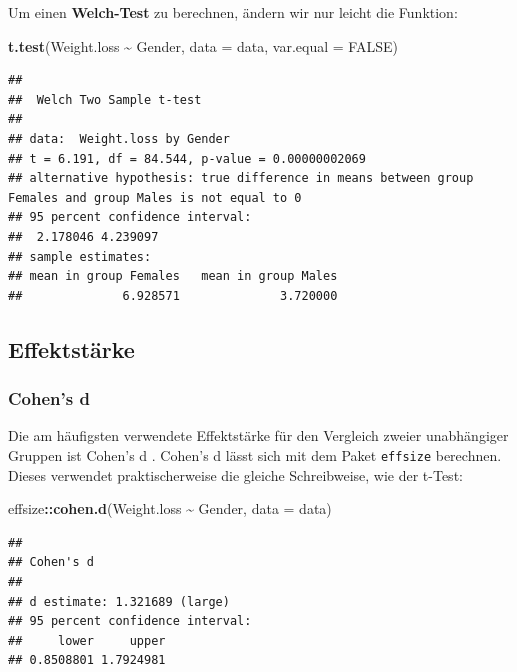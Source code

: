 \documentclass[
]{book}
\newenvironment{Shaded}{\begin{snugshade}}{\end{snugshade}}
\newcommand{\AttributeTok}[1]{\textcolor[rgb]{0.13,0.29,0.53}{#1}}
\newcommand{\ConstantTok}[1]{\textcolor[rgb]{0.56,0.35,0.01}{#1}}
\newcommand{\FunctionTok}[1]{\textcolor[rgb]{0.13,0.29,0.53}{\textbf{#1}}}
\newcommand{\NormalTok}[1]{#1}
\newcommand{\SpecialCharTok}[1]{\textcolor[rgb]{0.81,0.36,0.00}{\textbf{#1}}}
\begin{document}
Um einen \textbf{Welch-Test} zu berechnen, ändern wir nur leicht die Funktion:

\begin{Shaded}
\begin{Highlighting}[]
\FunctionTok{t.test}\NormalTok{(Weight.loss }\SpecialCharTok{\textasciitilde{}}\NormalTok{ Gender, }\AttributeTok{data =}\NormalTok{ data, }\AttributeTok{var.equal =} \ConstantTok{FALSE}\NormalTok{)}
\end{Highlighting}
\end{Shaded}

\begin{verbatim}
## 
##  Welch Two Sample t-test
## 
## data:  Weight.loss by Gender
## t = 6.191, df = 84.544, p-value = 0.00000002069
## alternative hypothesis: true difference in means between group Females and group Males is not equal to 0
## 95 percent confidence interval:
##  2.178046 4.239097
## sample estimates:
## mean in group Females   mean in group Males 
##              6.928571              3.720000
\end{verbatim}

\subsection{Effektstärke}\label{effektstuxe4rke-1}

\subsubsection{Cohen's d}\label{cohens-d-1}

Die am häufigsten verwendete Effektstärke für den Vergleich zweier unabhängiger Gruppen ist Cohen's d \citet{cohen1988statistical}.
Cohen's d lässt sich mit dem Paket \texttt{effsize} berechnen. Dieses verwendet praktischerweise die gleiche Schreibweise, wie der t-Test:

\begin{Shaded}
\begin{Highlighting}[]
\NormalTok{effsize}\SpecialCharTok{::}\FunctionTok{cohen.d}\NormalTok{(Weight.loss }\SpecialCharTok{\textasciitilde{}}\NormalTok{ Gender, }\AttributeTok{data =}\NormalTok{ data)}
\end{Highlighting}
\end{Shaded}

\begin{verbatim}
## 
## Cohen's d
## 
## d estimate: 1.321689 (large)
## 95 percent confidence interval:
##     lower     upper 
## 0.8508801 1.7924981
\end{verbatim}
\end{document}
